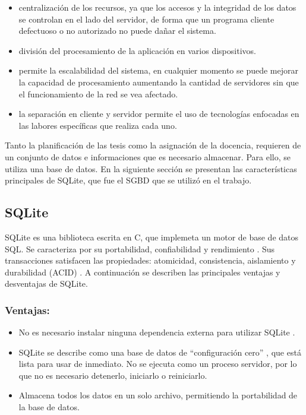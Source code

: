 \begin{itemize}
    \item centralización de los recursos, ya que los accesos y la integridad de los datos se controlan en el lado del servidor, de forma que un programa cliente defectuoso o no autorizado no puede dañar el sistema.
    \item división del procesamiento de la aplicación en varios dispositivos.
    \item permite la escalabilidad del sistema, en cualquier momento se puede mejorar la capacidad de procesamiento aumentando la cantidad de servidores sin que el funcionamiento de la red se vea afectado.
    \item la separación en cliente y servidor permite el uso de tecnologías enfocadas en las labores específicas que realiza cada uno. 
\end{itemize}
 

Tanto la planificación de las tesis como la asignación de la docencia, requieren de un 
conjunto de datos e informaciones que es necesario almacenar. Para ello, se 
utiliza una base de datos. En la siguiente sección se presentan las características principales 
de SQLite, que fue el SGBD que se utilizó en el trabajo.

\subsection{SQLite}

SQLite es una biblioteca escrita en C, que implemeta un motor de base de datos SQL.
Se caracteriza por su portabilidad, confiabilidad \cite{sqlite_high_reliability} y rendimiento \cite{sqlite_fast}. Sus transacciones 
satisfacen las propiedades: atomicidad, consistencia, aislamiento y durabilidad (ACID) \cite{acid}. A continuación se describen las principales ventajas 
y desventajas de SQLite.

\subsubsection{Ventajas:}

\begin{itemize}
    \item No es necesario instalar ninguna dependencia externa para utilizar SQLite \cite{sqlite_self_contained}.    
    \item SQLite se describe como una base de datos de ``configuración cero'' \cite{sqlite_about}, que está lista para 
    usar de inmediato. No se ejecuta como un proceso servidor, por lo que no es necesario detenerlo,
    iniciarlo o reiniciarlo.
    \item Almacena todos los datos en un solo archivo, permitiendo la portabilidad de la base de datos. 
\end{itemize}


